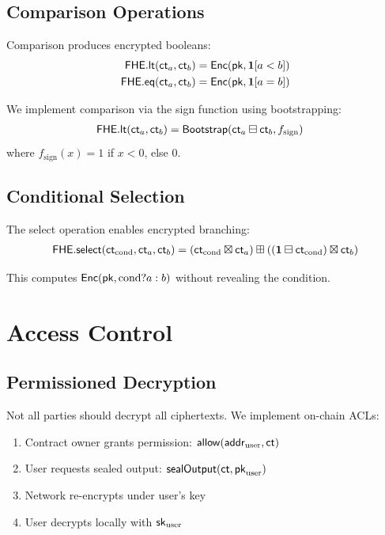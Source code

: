 \documentclass{../shared/luxfhe}
\begin{document}
\subsection{Comparison Operations}

Comparison produces encrypted booleans:
\begin{align}
\mathsf{FHE.lt}(\mathsf{ct}_a, \mathsf{ct}_b) &= \mathsf{Enc}(\mathsf{pk}, \mathbf{1}[a < b]) \\
\mathsf{FHE.eq}(\mathsf{ct}_a, \mathsf{ct}_b) &= \mathsf{Enc}(\mathsf{pk}, \mathbf{1}[a = b])
\end{align}

We implement comparison via the sign function using bootstrapping:
\begin{align}
\mathsf{FHE.lt}(\mathsf{ct}_a, \mathsf{ct}_b) &= \mathsf{Bootstrap}(\mathsf{ct}_a \boxminus \mathsf{ct}_b, f_{\text{sign}})
\end{align}
where $f_{\text{sign}}(x) = 1$ if $x < 0$, else $0$.

\subsection{Conditional Selection}

The select operation enables encrypted branching:
\begin{align}
\mathsf{FHE.select}(\mathsf{ct}_{\text{cond}}, \mathsf{ct}_a, \mathsf{ct}_b) = (\mathsf{ct}_{\text{cond}} \boxtimes \mathsf{ct}_a) \boxplus ((\mathbf{1} \boxminus \mathsf{ct}_{\text{cond}}) \boxtimes \mathsf{ct}_b)
\end{align}

This computes $\mathsf{Enc}(\mathsf{pk}, \text{cond} ? a : b)$ without revealing the condition.

\section{Access Control}

\subsection{Permissioned Decryption}

Not all parties should decrypt all ciphertexts. We implement on-chain ACLs:

\begin{protocol}
\begin{enumerate}
    \item Contract owner grants permission: $\mathsf{allow}(\mathsf{addr}_{\text{user}}, \mathsf{ct})$
    \item User requests sealed output: $\mathsf{sealOutput}(\mathsf{ct}, \mathsf{pk}_{\text{user}})$
    \item Network re-encrypts under user's key
    \item User decrypts locally with $\mathsf{sk}_{\text{user}}$
\end{enumerate}
\end{protocol}
\end{document}
